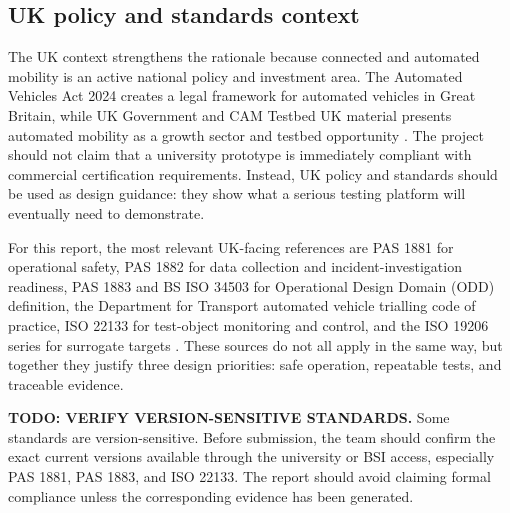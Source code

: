 \subsection{UK policy and standards context}

The UK context strengthens the rationale because connected and automated mobility is an active national policy and investment area. The Automated Vehicles Act 2024 creates a legal framework for automated vehicles in Great Britain, while UK Government and CAM Testbed UK material presents automated mobility as a growth sector and testbed opportunity \parencite{automatedVehiclesAct2024,govukAVJobs2025,camTestbedUK}. The project should not claim that a university prototype is immediately compliant with commercial certification requirements. Instead, UK policy and standards should be used as design guidance: they show what a serious testing platform will eventually need to demonstrate.

For this report, the most relevant UK-facing references are PAS 1881 for operational safety, PAS 1882 for data collection and incident-investigation readiness, PAS 1883 and BS ISO 34503 for Operational Design Domain (ODD) definition, the Department for Transport automated vehicle trialling code of practice, ISO 22133 for test-object monitoring and control, and the ISO 19206 series for surrogate targets \parencite{bsiPAS1881,bsiPAS1882,bsiPAS1883,iso34503,dftTriallingCode,iso22133,iso19206series}. These sources do not all apply in the same way, but together they justify three design priorities: safe operation, repeatable tests, and traceable evidence.

\textbf{TODO: VERIFY VERSION-SENSITIVE STANDARDS.} Some standards are version-sensitive. Before submission, the team should confirm the exact current versions available through the university or BSI access, especially PAS 1881, PAS 1883, and ISO 22133. The report should avoid claiming formal compliance unless the corresponding evidence has been generated.

